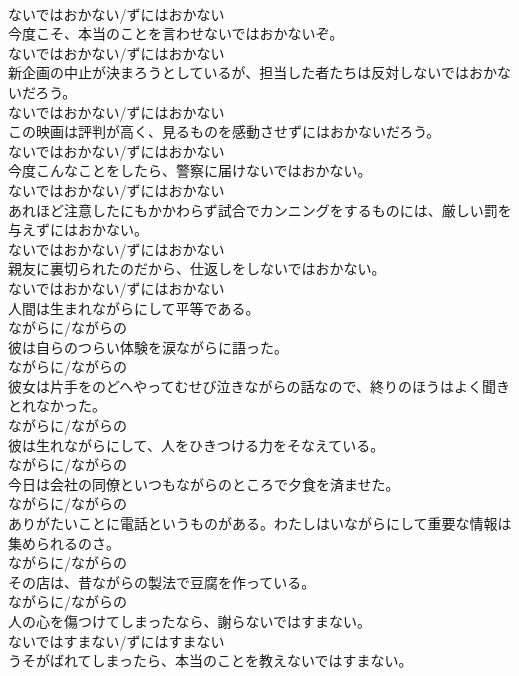\documentclass[8pt]{extreport}
\begin{document}
\begin{CJK}{UTF8}{min}
\\	ないではおかない/ずにはおかない	
\\	今度こそ、本当のことを言わせないではおかないぞ。	
\\	ないではおかない/ずにはおかない	
\\	新企画の中止が決まろうとしているが、担当した者たちは反対しないではおかないだろう。	
\\	ないではおかない/ずにはおかない	
\\	この映画は評判が高く、見るものを感動させずにはおかないだろう。	
\\	ないではおかない/ずにはおかない	
\\	今度こんなことをしたら、警察に届けないではおかない。	
\\	ないではおかない/ずにはおかない	
\\	あれほど注意したにもかかわらず試合でカンニングをするものには、厳しい罰を与えずにはおかない。	
\\	ないではおかない/ずにはおかない	
\\	親友に裏切られたのだから、仕返しをしないではおかない。	
\\	ないではおかない/ずにはおかない	
\\	人間は生まれながらにして平等である。	
\\	ながらに/ながらの	
\\	彼は自らのつらい体験を涙ながらに語った。	
\\	ながらに/ながらの	
\\	彼女は片手をのどへやってむせび泣きながらの話なので、終りのほうはよく聞きとれなかった。	
\\	ながらに/ながらの	
\\	彼は生れながらにして、人をひきつける力をそなえている。	
\\	ながらに/ながらの	
\\	今日は会社の同僚といつもながらのところで夕食を済ませた。	
\\	ながらに/ながらの	
\\	ありがたいことに電話というものがある。わたしはいながらにして重要な情報は集められるのさ。	
\\	ながらに/ながらの	
\\	その店は、昔ながらの製法で豆腐を作っている。	
\\	ながらに/ながらの	
\\	人の心を傷つけてしまったなら、謝らないではすまない。	
\\	ないではすまない/ずにはすまない	
\\	うそがばれてしまったら、本当のことを教えないではすまない。	

\end{CJK}
\end{document}
